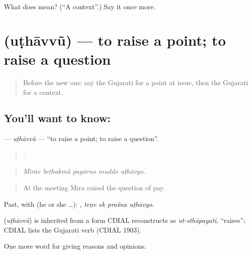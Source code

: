 \begin{tcolorbox}[breakable,colback=teal!4,colframe=teal!35!black,title={Before you move on}]
What does  mean? (\textquotedblleft{}A context\textquotedblright{}.) Say it once more.
\end{tcolorbox}
\section[\texorpdfstring{\gu{ઉઠાવવું} (uṭhāvvũ)}{ઉઠાવવું (uṭhāvvũ)}]{ (uṭhāvvũ) — to raise a point; to raise a question}

\label{lesson:GU-C341-uthavvu}



\begin{quote}
Before the new one: say the Gujarati for a point at issue, then the Gujarati for a context.
\end{quote}

\subsection*{You'll want to know: }
\textbf{} — \emph{uṭhāvvũ} — \textquotedblleft{}to raise a point; to raise a question\textquotedblright{}.

\begin{quote}
    .
\end{quote}

\begin{quote}
\emph{Mīrāe beṭhakmā̃ pagārno muddo uṭhāvyo.}
\end{quote}

\begin{quote}
At the meeting Mira raised the question of pay.
\end{quote}

Past, with  (he or she …):    , \emph{teṇe ek praśna uṭhāvyo}.

\begin{cousinweb}
\textbf{} (\emph{uṭhāvvũ}) is inherited from a form CDIAL reconstructs as \emph{ut-sthāpayati}, \textquotedblleft{}raises\textquotedblright{}; CDIAL lists the Gujarati verb (CDIAL 1903).
\end{cousinweb}

\begin{grammarlens}[title={What you've built}]
One more word for giving reasons and opinions.
\end{grammarlens}

